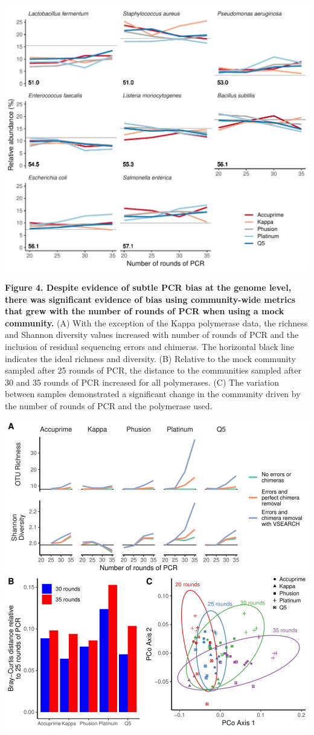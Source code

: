 \documentclass[11pt,]{article}
\begin{document}
\includegraphics[width=1.0\columnwidth]{../results/figures/species_bias.pdf}

\newpage

\textbf{Figure 4. Despite evidence of subtle PCR bias at the genome
level, there was significant evidence of bias using community-wide
metrics that grew with the number of rounds of PCR when using a mock
community.} (A) With the exception of the Kappa polymerase data, the
richness and Shannon diversity values increased with number of rounds of
PCR and the inclusion of residual sequencing errors and chimeras. The
horizontal black line indicates the ideal richness and diversity. (B)
Relative to the mock community sampled after 25 rounds of PCR, the
distance to the communities sampled after 30 and 35 rounds of PCR
increased for all polymerases. (C) The variation between samples
demonstrated a significant change in the community driven by the number
of rounds of PCR and the polymerase used.

\includegraphics[width=0.9\columnwidth]{../results/figures/mock_community.pdf}
\end{document}
